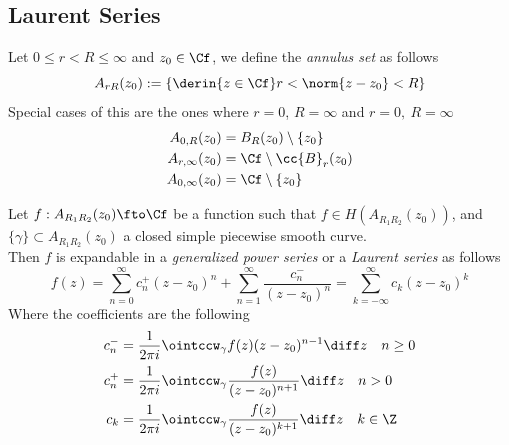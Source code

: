 \documentclass[../mmf.tex]{subfiles}
\begin{document}
\subsection{Laurent Series}
\begin{dfn}
	Let $0\le r<R\le\infty$ and $z_0\in\Cf$, we define the \textit{annulus set} as follows
	\begin{equation}
		A_{rR}(z_0):=\left\{ \derin{z\in\Cf}r<\norm{z-z_0}<R \right\}
		\label{eq:annulusdom}
	\end{equation}
	Special cases of this are the ones where $r=0$, $R=\infty$ and $r=0,\ R=\infty$
	\begin{equation*}
		\begin{aligned}
			A_{0,R}(z_0)&=B_R(z_0)\setminus\{z_0\}\\
			A_{r,\infty}(z_0)&=\Cf\setminus\cc{B}_r(z_0)\\
			A_{0,\infty}(z_0)&=\Cf\setminus\{z_0\}
		\end{aligned}
	\end{equation*}
\end{dfn}
\begin{thm}
	Let $f:A_{R_1R_2}(z_0)\fto\Cf$ be a function such that $f\in H\left(A_{R_1R_2}(z_0)\right)$, and $\{\gamma\}\subset A_{R_1R_2}(z_0)$ a closed simple piecewise smooth curve.\\
	Then $f$ is expandable in a \textit{generalized power series} or a \textit{Laurent series} as follows
	\begin{equation}
		f(z)=\sum_{n=0}^{\infty}c_n^+(z-z_0)^n+\sum_{n=1}^{\infty}\frac{c_n^-}{(z-z_0)^n}=\sum_{k=-\infty}^{\infty}c_k(z-z_0)^k
		\label{eq:laurentseries}
	\end{equation}
	Where the coefficients are the following
	\begin{equation}
		\begin{aligned}
			c_n^-&=\frac{1}{2\pi i}\ointccw_\gamma f(z)(z-z_0)^{n-1}\diff z\quad n\ge0\\
			c_n^+&=\frac{1}{2\pi i}\ointccw_\gamma\frac{f(z)}{(z-z_0)^{n+1}}\diff z\quad n>0\\
			c_k&=\frac{1}{2\pi i}\ointccw_\gamma\frac{f(z)}{(z-z_0)^{k+1}}\diff z\quad k\in\Z
		\end{aligned}
		\label{eq:coefficientlaurent}
	\end{equation}
\end{thm}
\end{document}
